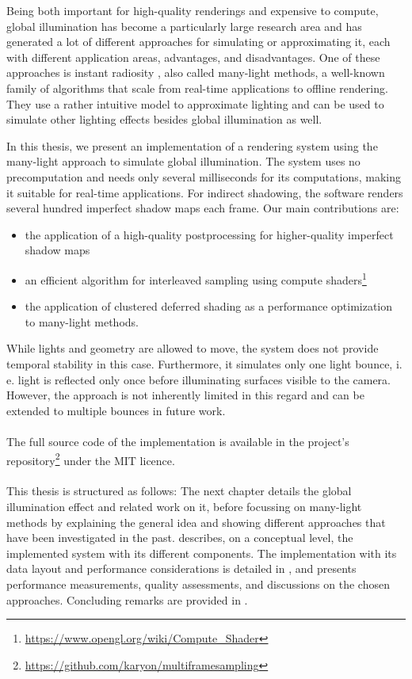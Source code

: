 Being both important for high-quality renderings and expensive to compute, global illumination has become a particularly large research area and has generated a lot of different approaches for simulating or approximating it, each with different application areas, advantages, and disadvantages. One of these approaches is instant radiosity \citep{Keller:1997:InstantRadiosity}, also called many-light methods, a well-known family of algorithms that scale from real-time applications to offline rendering. They use a rather intuitive model to approximate lighting and can be used to simulate other lighting effects besides global illumination as well.

In this thesis, we present an implementation of a rendering system using the many-light approach to simulate global illumination. The system uses no precomputation and needs only several milliseconds for its computations, making it suitable for real-time applications. For indirect shadowing, the software renders several hundred imperfect shadow maps \citep{ritschel2008ism} each frame. Our main contributions are:
\begin{itemize}
    \item the application of a high-quality postprocessing for higher-quality imperfect shadow maps
    \item an efficient algorithm for interleaved sampling \citep{Keller:2001:InterleavedSampling} using compute shaders\footnote{\url{https://www.opengl.org/wiki/Compute_Shader}}
    \item the application of clustered deferred shading \citep{olsson2012clustered} as a performance optimization to many-light methods.
\end{itemize}

While lights and geometry are allowed to move, the system does not provide temporal stability in this case. Furthermore, it simulates only one light bounce, i.\,e. light is reflected only once before illuminating surfaces visible to the camera. However, the approach is not inherently limited in this regard and can be extended to multiple bounces in future work.
\\
\\
The full source code of the implementation is available in the project's repository\footnote{\url{https://github.com/karyon/multiframesampling}} under the MIT licence.
\\
\\
This thesis is structured as follows: The next chapter details the global illumination effect and related work on it, before focussing on many-light methods by explaining the general idea and showing different approaches that have been investigated in the past.  describes, on a conceptual level, the implemented system with its different components. The implementation with its data layout and performance considerations is detailed in , and  presents performance measurements, quality assessments, and discussions on the chosen approaches. Concluding remarks are provided in .


\cleardoublepage
